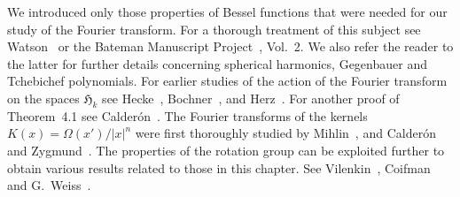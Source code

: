 \bibnoteshead

We introduced only those properties of Bessel functions that were needed for our study of the Fourier transform. For a thorough treatment of this subject see Watson~\cite{Watson1} or the Bateman Manuscript Project~\cite{Erdelyi1}, Vol.~2. We also refer the reader to the latter for further details concerning spherical harmonics, Gegenbauer and Tchebichef polynomials. For earlier studies of the action of the Fourier transform on the spaces $\mathfrak{H}_k$ see Hecke~\cite{Hecke1}, Bochner~\cite{Bochner6}, and Herz~\cite{Herz1}. For another proof of Theorem~4.1 see Calder\'on~\cite{Calderon3}. The Fourier transforms of the kernels $K(x) = \Omega(x')/|x|^n$ were first thoroughly studied by Mihlin~\cite{Mihlin1}, and Calder\'on and Zygmund~\cite{CalderonZygmund5}. The properties of the rotation group can be exploited further to obtain various results related to those in this chapter. See Vilenkin~\cite{Vilenkin1}, Coifman and G.~Weiss~\cite{CoifmanWeiss1}.
